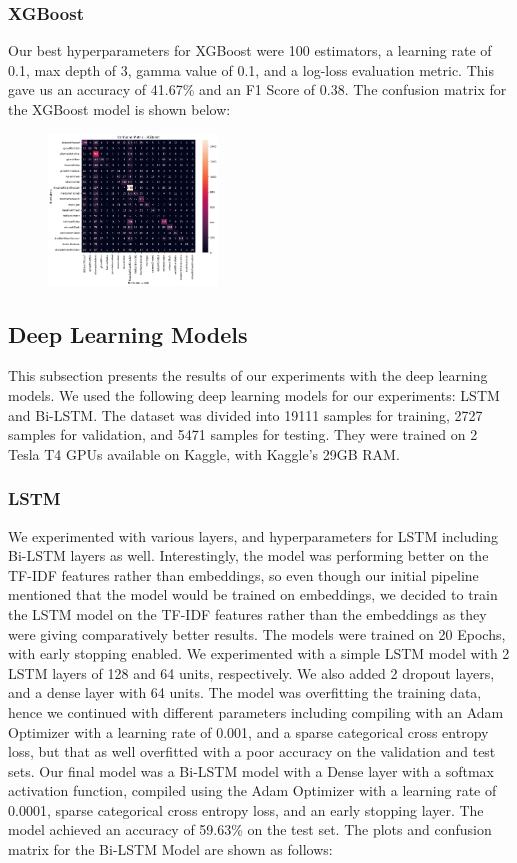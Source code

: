 \subsubsection{XGBoost}
Our best hyperparameters for XGBoost were 100 estimators, a learning rate of 0.1, max depth of 3, gamma value of 0.1, and a log-loss evaluation metric. This gave us an accuracy of 41.67\% and an F1 Score of 0.38. The confusion matrix for the XGBoost model is shown below:
\begin{figure}[H]
    \centering
    \includegraphics[width=0.4\textwidth]{xgboost_confmat.png}
\end{figure}

\subsection{Deep Learning Models}

This subsection presents the results of our experiments with the deep learning models. We used the following deep learning models for our experiments: LSTM and Bi-LSTM. The dataset was divided into 19111 samples for training, 2727 samples for validation, and 5471 samples for testing. They were trained on 2 Tesla T4 GPUs available on Kaggle, with Kaggle's 29GB RAM. 

\subsubsection{LSTM}
We experimented with various layers, and hyperparameters for LSTM including Bi-LSTM layers as well. Interestingly, the model was performing better on the TF-IDF features rather than embeddings, so even though our initial pipeline mentioned that the model would be trained on embeddings, we decided to train the LSTM model on the TF-IDF features rather than the embeddings as they were giving comparatively better results. The models were trained on 20 Epochs, with early stopping enabled. We experimented with a simple LSTM model with 2 LSTM layers of 128 and 64 units, respectively. We also added 2 dropout layers, and a dense layer with 64 units. The model was overfitting the training data, hence we continued with different parameters including compiling with an Adam Optimizer with a learning rate of 0.001, and a sparse categorical cross entropy loss, but that as well overfitted with a poor accuracy on the validation and test sets. Our final model was a Bi-LSTM model with a Dense layer with a softmax activation function, compiled using the Adam Optimizer with a learning rate of 0.0001, sparse categorical cross entropy loss, and an early stopping layer. The model achieved an accuracy of 59.63\% on the test set. The plots and confusion matrix for the Bi-LSTM Model are shown as follows:

